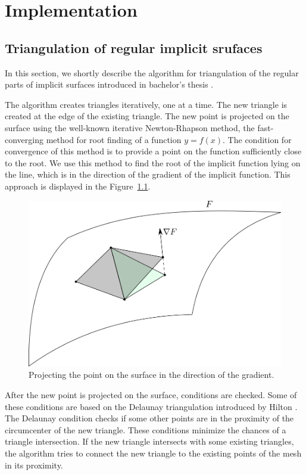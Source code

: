\chapter{Implementation}
\label{chap3}

\section{Triangulation of regular implicit srufaces}
\label{triangulation-implicit}

In this section, we shortly describe the algorithm for triangulation of the regular
parts of implicit surfaces introduced in bachelor's thesis \cite{korecova2021triangulation}.

The algorithm creates triangles iteratively, one at a time. The new triangle is
created at the edge of the existing triangle. The new point is projected on the
surface using the well-known iterative Newton-Rhapson method, the 
fast-converging method for root finding of a function $y=f(x)$. The condition 
for convergence of this method is to provide a point on the function sufficiently
close to the root. We use this method to find the root of the implicit
function lying on the line, which is in the direction of the gradient of the implicit
function. This approach is displayed in the Figure~\ref{img:29}.
\begin{figure}
    \centerline{\includegraphics[scale=0.5]{images/img29}}
    \caption[Projecting the point on the surface]
    {Projecting the point on the surface in the direction of the gradient.}
    \label{img:29}
\end{figure}

After the new point is projected on the surface, conditions are checked. 
Some of these conditions are based on the Delaunay triangulation introduced
by Hilton \cite{hilton1996marching}. The Delaunay condition checks
if some other points are in the proximity of the circumcenter of the new triangle.
These conditions minimize the chances of a triangle intersection.
If the new triangle intersects with some existing triangles, the algorithm
tries to connect the new triangle to the existing points of the mesh in its proximity.

